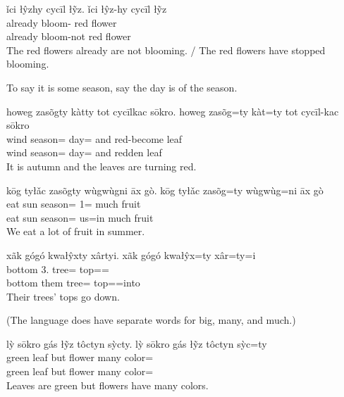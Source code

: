 \begin{exe}
    \ex
    ǐci łŷzhy cycīl łỹz.
    \glll
    ǐci łŷz-hy cycīl łỹz \\
    already bloom-\Neg{} red flower \\
    already bloom-not red flower \\
    \glt
    The red flowers already are not blooming.
    /
    The red flowers have stopped blooming.
\end{exe}

To say it is some season, say the day is of the season.
\begin{exe}
    \ex
    howeg zasõgty kàtty tot cycīlkac sōkro.
    \glll
    howeg zasõg=ty kàt=ty tot cycīl-kac sōkro \\
    wind season=\Poss{} day=\Poss{} and red-become leaf \\
    wind season=\Poss{} day=\Poss{} and redden leaf \\
    \glt
    It is autumn and the leaves are turning red.
\end{exe}

\begin{exe}
    \ex
    kōg tyłǎc zasõgty wùgwùgni āx gò.
    \glll
    kōg tyłǎc zasõg=ty wùgwùg=ni āx gò \\
    eat sun season=\Poss{} 1\Pl{}=\InessTwo{} much fruit \\
    eat sun season=\Poss{} us=in much fruit \\
    \glt
    We eat a lot of fruit in summer.
\end{exe}

\begin{exe}
    \ex
    xãk gógó kwałŷxty xârtyi.
    \glll
    xãk gógó kwałŷx=ty xâr=ty=i \\
    bottom 3\Pl{}.\Anim{} tree=\Poss{} top=\Poss{}=\IllThree{} \\
    bottom them tree=\Poss{} top=\Poss{}=into \\
    \glt
    Their trees' tops go down.
\end{exe}

(The language does have separate words for big, many, and much.)
\begin{exe}
    \ex
    lỳ sōkro gás łỹz tôctyn sỳcty.
    \glll
    lỳ sōkro gás łỹz tôctyn sỳc=ty \\
    green leaf but flower many color=\Poss{} \\
    green leaf but flower many color=\Poss{} \\
    \glt
    Leaves are green but flowers have many colors.
\end{exe}

